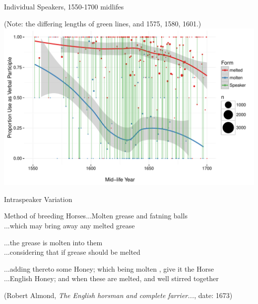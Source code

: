 \documentclass[hyperref={pdfpagelabels=false}]{beamer}
\begin{document}
\begin{frame}{Individual Speakers, 1550-1700 midlifes}

\begin{center}
\small{(Note: the differing lengths of green lines, and 1575, 1580, 1601.)}
\includegraphics[width=1.128\textwidth]{ContextByDateAuthor1550.pdf}
\end{center}%
\end{frame}

\begin{frame}{Intraspeaker Variation}
		\begin{exe}
			\ex \begin{xlist} \ex Method of breeding Horses...Molten grease and fatning balls\\
			\ex ...which may bring away any melted grease\\
			\end{xlist}
			\ex \begin{xlist} \ex ...the grease is molten into them\\
			\ex ...considering that if grease should be melted\\
			\end{xlist}
			\ex \begin{xlist} \ex...adding thereto some Honey; which being molten , give it the Horse\\
			\ex ...English Honey; and when these are melted, and well stirred together\\
			\end{xlist}
		\end{exe}
		(Robert Almond, \textsl{The English horsman and complete farrier...}, date: 1673)
\end{frame}
\end{document}
